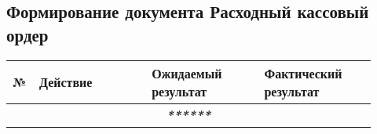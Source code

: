 \subsection{Формирование документа Расходный кассовый ордер}

\renewcommand{\arraystretch}{1.8} %
\begin{longtable}{|p{0.02\linewidth}|p{0.3\linewidth}|p{0.3\linewidth}|p{0.3\linewidth}|}
    \hline
    № & \textbf{Действие} & \textbf{Ожидаемый результат} & \textbf{Фактический результат} \\
    \hline
    \hline
    \endhead
    \multicolumn{4}{|c|}{\textbf{\textit{******}}} \\
    \hline
    \hline



\end{longtable}